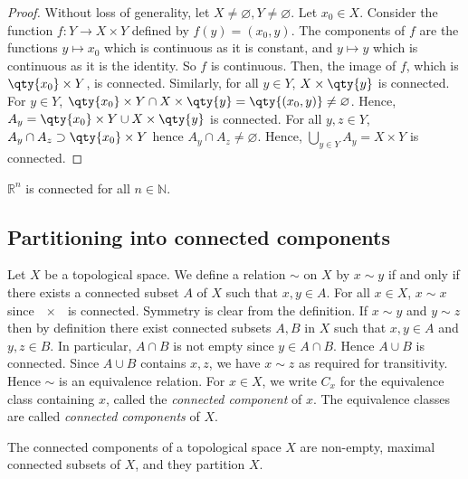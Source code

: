 \begin{proof}
	Without loss of generality, let \( X \neq \varnothing, Y \neq \varnothing \).
	Let \( x_0 \in X \).
	Consider the function \( f \colon Y \to X \times Y \) defined by \( f(y) = (x_0, y) \).
	The components of \( f \) are the functions \( y \mapsto x_0 \) which is continuous as it is constant, and \( y \mapsto y \) which is continuous as it is the identity.
	So \( f \) is continuous.
	Then, the image of \( f \), which is \( \qty{x_0} \times Y \), is connected.
	Similarly, for all \( y \in Y \), \( X \times \qty{y} \) is connected.
	For \( y \in Y \), \( \qty{x_0} \times Y \cap X \times \qty{y} = \qty{(x_0, y)} \neq \varnothing \).
	Hence, \( A_y = \qty{x_0} \times Y \cup X \times \qty{y} \) is connected.
	For all \( y,z \in Y \), \( A_y \cap A_z \supset \qty{x_0} \times Y \) hence \( A_y \cap A_z \neq \varnothing \).
	Hence, \( \bigcup_{y \in Y} A_y = X \times Y \) is connected.
\end{proof}
\begin{example}
	\( \mathbb R^n \) is connected for all \( n \in \mathbb N \).
\end{example}

\subsection{Partitioning into connected components}
\begin{definition}
	Let \( X \) be a topological space.
	We define a relation \( \sim \) on \( X \) by \( x \sim y \) if and only if there exists a connected subset \( A \) of \( X \) such that \( x, y \in A \).
	For all \( x \in X \), \( x \sim x \) since \( \qty{x} \) is connected.
	Symmetry is clear from the definition.
	If \( x \sim y \) and \( y \sim z \) then by definition there exist connected subsets \( A, B \) in \( X \) such that \( x, y \in A \) and \( y, z \in B \).
	In particular, \( A \cap B \) is not empty since \( y \in A \cap B \).
	Hence \( A \cup B \) is connected.
	Since \( A \cup B \) contains \( x, z \), we have \( x \sim z \) as required for transitivity.
	Hence \( \sim \) is an equivalence relation.
	For \( x \in X \), we write \( C_x \) for the equivalence class containing \( x \), called the \textit{connected component} of \( x \).
	The equivalence classes are called \textit{connected components} of \( X \).
\end{definition}
\begin{proposition}
	The connected components of a topological space \( X \) are non-empty, maximal connected subsets of \( X \), and they partition \( X \).
\end{proposition}
